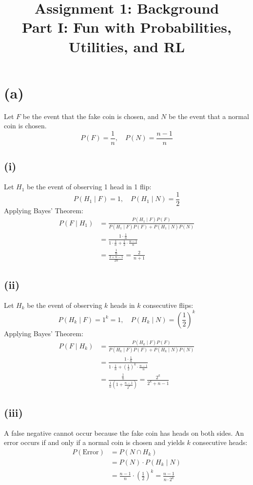 \documentclass[11pt]{article}
\title{\textbf{Assignment 1: Background\\Part I: Fun with Probabilities, Utilities, and RL}}
\date{}
\begin{document}
\maketitle

\section*{(a)}

Let $F$ be the event that the fake coin is chosen, and $N$ be the event that a normal coin is chosen.
\[
P(F) = \frac{1}{n}, \quad P(N) = \frac{n-1}{n}
\]

\subsection*{(i)}

Let $H_1$ be the event of observing 1 head in 1 flip:
\[
P(H_1 \mid F) = 1, \quad P(H_1 \mid N) = \frac{1}{2}
\]
Applying Bayes' Theorem:
\begin{align*}
P(F \mid H_1) &= \frac{P(H_1 \mid F) P(F)}{P(H_1 \mid F) P(F) + P(H_1 \mid N) P(N)} \\[1ex]
&= \frac{1 \cdot \frac{1}{n}}{1 \cdot \frac{1}{n} + \frac{1}{2} \cdot \frac{n-1}{n}} \\[1ex]
&= \frac{\frac{1}{n}}{\frac{2 + n - 1}{2n}} = \frac{2}{n+1}
\end{align*}

\subsection*{(ii)}

Let $H_k$ be the event of observing $k$ heads in $k$ consecutive flips:
\[
P(H_k \mid F) = 1^k = 1, \quad P(H_k \mid N) = \left(\frac{1}{2}\right)^k
\]
Applying Bayes' Theorem:
\begin{align*}
P(F \mid H_k) &= \frac{P(H_k \mid F) P(F)}{P(H_k \mid F) P(F) + P(H_k \mid N) P(N)} \\[1ex]
&= \frac{1 \cdot \frac{1}{n}}{1 \cdot \frac{1}{n} + \left(\frac{1}{2}\right)^k \cdot \frac{n-1}{n}} \\[1ex]
&= \frac{\frac{1}{n}}{\frac{1}{n}\left(1 + \frac{n-1}{2^k}\right)} = \frac{2^k}{2^k + n - 1}
\end{align*}

\subsection*{(iii)}

A false negative cannot occur because the fake coin has heads on both sides. An error occurs if and only if a normal coin is chosen and yields $k$ consecutive heads:
\begin{align*}
P(\text{Error}) &= P(N \cap H_k) \\[1ex]
&= P(N) \cdot P(H_k \mid N) \\[1ex]
&= \frac{n-1}{n} \cdot \left(\frac{1}{2}\right)^k = \frac{n-1}{n \cdot 2^k}
\end{align*}
\end{document}
